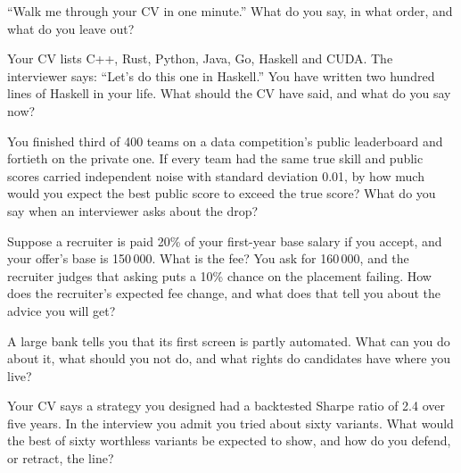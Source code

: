 \begin{interviewq}\label{iq:iv:applications:2}
``Walk me through your CV in one minute.'' What do you say, in what order, and what do you leave out?
\end{interviewq}

\begin{interviewq}\label{iq:iv:applications:3}
Your CV lists C++, Rust, Python, Java, Go, Haskell and CUDA. The interviewer says: ``Let's do this one in
Haskell.'' You have written two hundred lines of Haskell in your life. What should the CV have said, and what
do you say now?
\end{interviewq}

\begin{interviewq}\label{iq:iv:applications:4}
You finished third of 400 teams on a data competition's public leaderboard and fortieth on the private one.
If every team had the same true skill and public scores carried independent noise with standard deviation
0.01, by how much would you expect the best public score to exceed the true score? What do you say when an
interviewer asks about the drop?
\end{interviewq}

\begin{interviewq}\label{iq:iv:applications:5}
Suppose a recruiter is paid 20\% of your first-year base salary if you accept, and your offer's base is
150\,000. What is the fee? You ask for 160\,000, and the recruiter judges that asking puts a 10\% chance on
the placement failing. How does the recruiter's expected fee change, and what does that tell you about the
advice you will get?
\end{interviewq}

\begin{interviewq}\label{iq:iv:applications:6}
A large bank tells you that its first screen is partly automated. What can you do about it, what should you
not do, and what rights do candidates have where you live?
\end{interviewq}

\begin{interviewq}\label{iq:iv:applications:7}
Your CV says a strategy you designed had a backtested Sharpe ratio of 2.4 over five years. In the interview
you admit you tried about sixty variants. What would the best of sixty worthless variants be expected to show,
and how do you defend, or retract, the line?
\end{interviewq}

